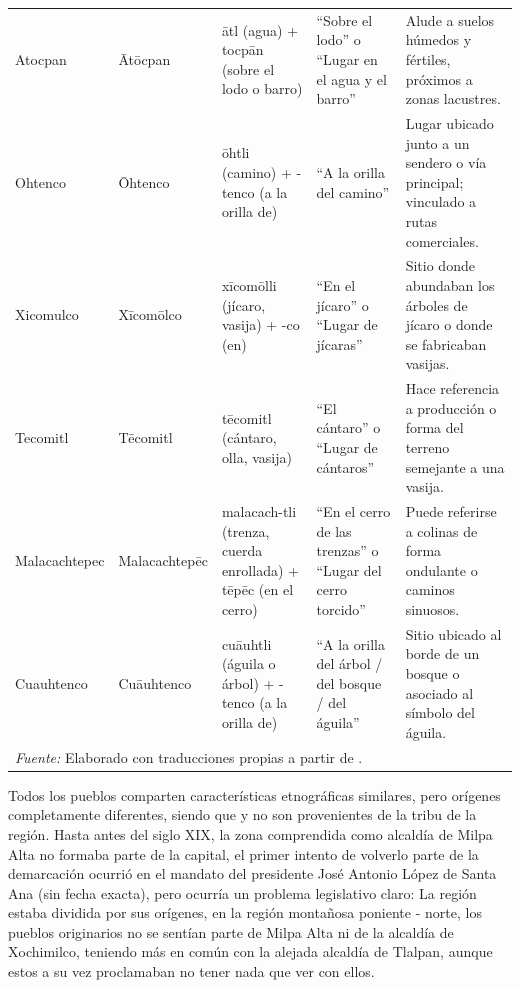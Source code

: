 \begin{table}[H]
\begin{tabularx}{\textwidth}{l l X X X}
        Atocpan & Ātōcpan & ātl (agua) + tocpān (sobre el lodo o barro) & ``Sobre el lodo'' o ``Lugar en el agua y el barro'' & Alude a suelos húmedos y fértiles, próximos a zonas lacustres. \\
        \addlinespace
        Ohtenco & Ōhtenco & ōhtli (camino) + -tenco (a la orilla de) & ``A la orilla del camino'' & Lugar ubicado junto a un sendero o vía principal; vinculado a rutas comerciales. \\
        \addlinespace
        Xicomulco & Xīcomōlco & xīcomōlli (jícaro, vasija) + -co (en) & ``En el jícaro'' o ``Lugar de jícaras'' & Sitio donde abundaban los árboles de jícaro o donde se fabricaban vasijas. \\
        \addlinespace
        Tecomitl & Tēcomitl & tēcomitl (cántaro, olla, vasija) & ``El cántaro'' o ``Lugar de cántaros'' & Hace referencia a producción o forma del terreno semejante a una vasija. \\
        \addlinespace
        Malacachtepec & Malacachtepēc & malacach-tli (trenza, cuerda enrollada) + tēpēc (en el cerro) & ``En el cerro de las trenzas'' o ``Lugar del cerro torcido'' & Puede referirse a colinas de forma ondulante o caminos sinuosos. \\
        \addlinespace
        Cuauhtenco & Cuāuhtenco & cuāuhtli (águila o árbol) + -tenco (a la orilla de) & ``A la orilla del árbol / del bosque / del águila'' & Sitio ubicado al borde de un bosque o asociado al símbolo del águila. \\
        \midrule
        \multicolumn{5}{l}{\footnotesize \textit{Fuente:} Elaborado con traducciones propias a partir de \cite{diccionario_nahuatl2018}.} \\
        \bottomrule
    \end{tabularx}
\end{table}
Todos los pueblos comparten características etnográficas similares, pero orígenes completamente diferentes, siendo que
 y  no son provenientes de la tribu  de la región.
Hasta antes del siglo XIX, la zona comprendida como alcaldía de Milpa Alta no formaba parte de la capital, el primer intento
de volverlo parte de la demarcación ocurrió en el mandato del presidente José Antonio López de Santa Ana (sin fecha exacta),
pero ocurría un problema legislativo claro: La región estaba dividida por sus orígenes, en la región montañosa poniente - norte,
los pueblos originarios no se sentían parte de Milpa Alta ni de la alcaldía de Xochimilco, teniendo más en común con la alejada
alcaldía de Tlalpan, aunque estos a su vez proclamaban no tener nada que ver con ellos.

